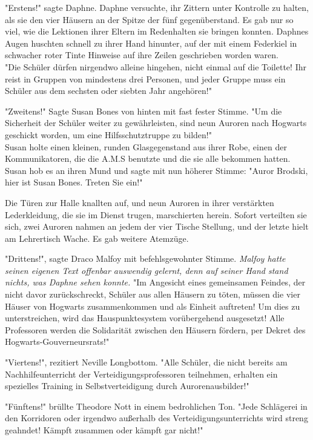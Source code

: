 {"Erstens!" sagte Daphne. Daphne versuchte, ihr Zittern unter Kontrolle zu halten, als sie den vier Häusern an der Spitze der fünf gegenüberstand. Es gab nur so viel, wie die Lektionen ihrer Eltern im Redenhalten sie bringen konnten. Daphnes Augen huschten schnell zu ihrer Hand hinunter, auf der mit einem Federkiel in schwacher roter Tinte Hinweise auf ihre Zeilen geschrieben worden waren.\\ "Die Schüler dürfen nirgendwo alleine hingehen, nicht einmal auf die Toilette! Ihr reist in Gruppen von mindestens drei Personen, und jeder Gruppe muss ein Schüler aus dem sechsten oder siebten Jahr angehören!"

"Zweitens!" Sagte Susan Bones von hinten mit fast fester Stimme. "Um die Sicherheit der Schüler weiter zu gewährleisten, sind neun Auroren nach Hogwarts geschickt worden, um eine Hilfsschutztruppe zu bilden!"\\ Susan holte einen kleinen, runden Glasgegenstand aus ihrer Robe, einen der Kommunikatoren, die die A.M.S benutzte und die sie alle bekommen hatten. Susan hob es an ihren Mund und sagte mit nun höherer Stimme: "Auror Brodski, hier ist Susan Bones. Treten Sie ein!"

Die Türen zur Halle knallten auf, und neun Auroren in ihrer verstärkten Lederkleidung, die sie im Dienst trugen, marschierten herein. Sofort verteilten sie sich, zwei Auroren nahmen an jedem der vier Tische Stellung, und der letzte hielt am Lehrertisch Wache. Es gab weitere Atemzüge.

"Drittens!", sagte Draco Malfoy mit befehlsgewohnter Stimme. \emph{Malfoy hatte seinen eigenen Text offenbar auswendig gelernt, denn auf seiner Hand stand nichts, was Daphne sehen konnte.} "Im Angesicht eines gemeinsamen Feindes, der nicht davor zurückschreckt, Schüler aus allen Häusern zu töten, müssen die vier Häuser von Hogwarts zusammenkommen und als Einheit auftreten! Um dies zu unterstreichen, wird das Hauspunktesystem vorübergehend ausgesetzt! Alle Professoren werden die Solidarität zwischen den Häusern fördern, per Dekret des Hogwarts-Gouverneursrats!"

"Viertens!", rezitiert Neville Longbottom. "Alle Schüler, die nicht bereits am Nachhilfeunterricht der Verteidigungsprofessoren teilnehmen, erhalten ein spezielles Training in Selbstverteidigung durch Aurorenausbilder!"

"Fünftens!" brüllte Theodore Nott in einem bedrohlichen Ton. "Jede Schlägerei in den Korridoren oder irgendwo außerhalb des Verteidigungsunterrichts wird streng geahndet! Kämpft zusammen oder kämpft gar nicht!"

}
